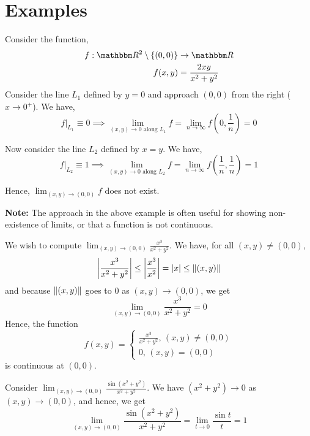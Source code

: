 \documentclass[Analysis-3]{subfiles}
\begin{document}
\section{Examples}
\begin{Eg}{}{}
  Consider the function,
  \begin{align*}
    f: \R^2 \setminus \{(0,0)\} & \to \R                \\
    f(x,y)                      & = \frac{2xy}{x^2+y^2}
  \end{align*}
  Consider the line $ L_1 $ defined by $ y=0 $ and approach $ (0,0) $ from the right ($ x \longrightarrow 0^{+} $). We have,
  \[ f\big|_{L_1} \equiv 0 \implies \lim_{(x,y) \to 0 \text{ along }L_1} f = \lim_{n \to \infty}f\left(0,\frac 1n\right) =  0 \]

  Now consider the line $ L_2 $ defined by $ x=y $. We have,
  \[ f\big|_{L_2} \equiv 1 \implies \lim_{(x,y) \to 0 \text{ along }L_2} f = \lim_{n \to \infty}f\left(\frac 1n,\frac 1n\right) =  1 \]

  Hence, $ \displaystyle \lim_{(x,y)\to(0,0)}f $ does not exist.
\end{Eg}
\textbf{Note:} The approach in the above example is often useful for showing non-existence of limits, or that a function is not continuous.
\msk

\begin{Eg}{}{}
  We wish to compute $ \displaystyle \lim_{(x,y) \to (0,0)}\frac{x^3}{x^2+y^2} $. We have, for all $ (x,y) \neq (0,0) $,
  \[ \abs{\frac{x^3}{x^2+y^2}} \leq \abs{\frac{x^3}{x^2}} = \abs{x} \leq \norm{(x,y)} \]
  and because $ \norm{(x,y)} $ goes to $ 0 $ as $ (x,y) \longrightarrow (0,0) $, we get
  \[ \displaystyle \lim_{(x,y) \to (0,0)}\frac{x^3}{x^2+y^2} = 0 \]
  Hence, the function
  \[ f(x,y) =
    \begin{cases}
      \frac{x^3}{x^2+y^2}, \, (x,y) \neq (0,0) \\
      0, \, (x,y) = (0,0)
    \end{cases} \]
  is continuous at $ (0,0) $.
\end{Eg}

\begin{Eg}{}{}
  Consider $ \displaystyle \lim_{(x,y) \to (0,0)} \frac{\sin (x^2+y^2)}{x^2+y^2} $. We have $ (x^2+y^2) \longrightarrow 0 $ as $ (x,y) \to (0,0) $, and hence, we get
  \[ \lim_{(x,y) \to (0,0)} \frac{\sin (x^2+y^2)}{x^2+y^2} = \lim_{t \to 0}\frac{\sin t}{t} = 1 \]
\end{Eg}
\pagebreak
\end{document}
